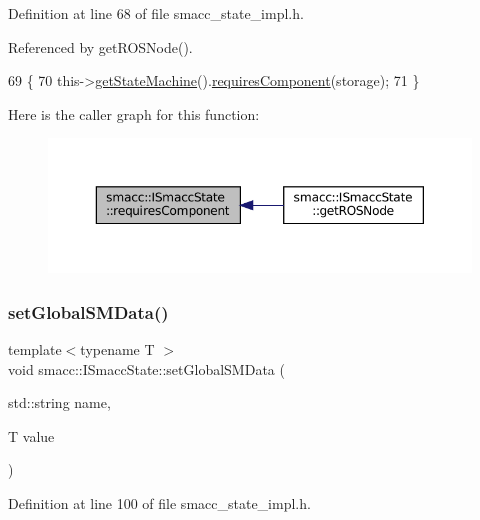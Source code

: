 Definition at line 68 of file smacc\+\_\+state\+\_\+impl.\+h.



Referenced by get\+R\+O\+S\+Node().


\begin{DoxyCode}
69 \{
70     this->\hyperlink{classsmacc_1_1ISmaccState_a562bb3f9a3ac16b8be71e4794c9e7523}{getStateMachine}().\hyperlink{classsmacc_1_1ISmaccStateMachine_aa6b25e28f3bce24c4b356dc865a9eb7b}{requiresComponent}(storage);
71 \}
\end{DoxyCode}
Here is the caller graph for this function\+:
\nopagebreak
\begin{figure}[H]
\begin{center}
\leavevmode
\includegraphics[width=350pt]{classsmacc_1_1ISmaccState_afd5264c36403d22e124eea89a0122e59_icgraph}
\end{center}
\end{figure}
\mbox{\label{classsmacc_1_1ISmaccState_a120fcda41b44a437ff2e3906ac9fa5ca}} 
\subsubsection{\texorpdfstring{set\+Global\+S\+M\+Data()}{setGlobalSMData()}}
{\footnotesize\ttfamily template$<$typename T $>$ \\
void smacc\+::\+I\+Smacc\+State\+::set\+Global\+S\+M\+Data (\begin{DoxyParamCaption}\item[{std\+::string}]{name,  }\item[{T}]{value }\end{DoxyParamCaption})}



Definition at line 100 of file smacc\+\_\+state\+\_\+impl.\+h.



